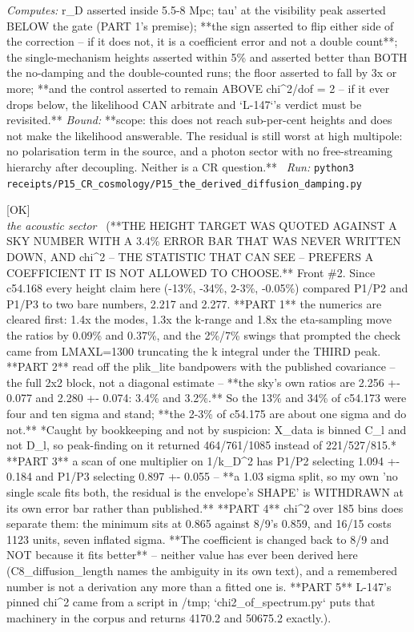 \begin{description}
\emph{Computes:} r\_D asserted inside 5.5-8 Mpc; tau' at the visibility peak asserted BELOW the gate (PART 1's premise); **the sign asserted to flip either side of the correction -- if it does not, it is a coefficient error and not a double count**; the single-mechanism heights asserted within 5\% and asserted better than BOTH the no-damping and the double-counted runs; the floor asserted to fall by 3x or more; **and the control asserted to remain ABOVE chi\textasciicircum{}2/dof = 2 -- if it ever drops below, the likelihood CAN arbitrate and `L-147`'s verdict must be revisited.**
 \emph{Bound:} **scope: this does not reach sub-per-cent heights and does not make the likelihood answerable. The residual is still worst at high multipole: no polarisation term in the source, and a photon sector with no free-streaming hierarchy after decoupling. Neither is a CR question.**
\ \emph{Run:} \texttt{python3 receipts/P15\_CR\_cosmology/P15\_the\_derived\_diffusion\_damping.py}
\item[\label{rcpt:P15_the_height_target_was_below_the_resolution_of_its_own_statistic}\texttt{P15\_the\_height\_target\_was\_below\_the\_resolution\_of\_its\_own\_statistic}]\hfill\textsf{[OK]}\\
\textit{the acoustic sector} \ (**THE HEIGHT TARGET WAS QUOTED AGAINST A SKY NUMBER WITH A 3.4\% ERROR BAR THAT WAS NEVER WRITTEN DOWN, AND chi\textasciicircum{}2 -- THE STATISTIC THAT CAN SEE -- PREFERS A COEFFICIENT IT IS NOT ALLOWED TO CHOOSE.** Front \#2. Since c54.168 every height claim here (-13\%, -34\%, 2-3\%, -0.05\%) compared P1/P2 and P1/P3 to two bare numbers, 2.217 and 2.277. **PART 1** the numerics are cleared first: 1.4x the modes, 1.3x the k-range and 1.8x the eta-sampling move the ratios by 0.09\% and 0.37\%, and the 2\%/7\% swings that prompted the check came from LMAXL=1300 truncating the k integral under the THIRD peak. **PART 2** read off the plik\_lite bandpowers with the published covariance -- the full 2x2 block, not a diagonal estimate -- **the sky's own ratios are 2.256 +- 0.077 and 2.280 +- 0.074: 3.4\% and 3.2\%.** So the 13\% and 34\% of c54.173 were four and ten sigma and stand; **the 2-3\% of c54.175 are about one sigma and do not.** *Caught by bookkeeping and not by suspicion: X\_data is binned C\_l and not D\_l, so peak-finding on it returned 464/761/1085 instead of 221/527/815.* **PART 3** a scan of one multiplier on 1/k\_D\textasciicircum{}2 has P1/P2 selecting 1.094 +- 0.184 and P1/P3 selecting 0.897 +- 0.055 -- **a 1.03 sigma split, so my own 'no single scale fits both, the residual is the envelope's SHAPE' is WITHDRAWN at its own error bar rather than published.** **PART 4** chi\textasciicircum{}2 over 185 bins does separate them: the minimum sits at 0.865 against 8/9's 0.859, and 16/15 costs 1123 units, seven inflated sigma. **The coefficient is changed back to 8/9 and NOT because it fits better** -- neither value has ever been derived here (C8\_diffusion\_length names the ambiguity in its own text), and a remembered number is not a derivation any more than a fitted one is. **PART 5** L-147's pinned chi\textasciicircum{}2 came from a script in /tmp; `chi2\_of\_spectrum.py` puts that machinery in the corpus and returns 4170.2 and 50675.2 exactly.). 

\end{description}
